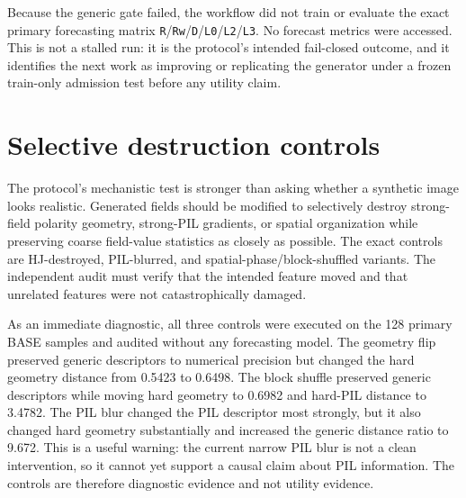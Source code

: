 \documentclass[11pt,oneside]{report}
\begin{document}
\begin{table}[htbp]
\centering\small
\caption{Completed remote train-only gate. Targeted distances improved, but the broad generic gate failed for every fresh arm.}
\label{tab:remote-physics-gate}
\end{table}

Because the generic gate failed, the workflow did not train or evaluate the exact primary forecasting matrix \texttt{R}/\texttt{Rw}/\texttt{D}/\texttt{L0}/\texttt{L2}/\texttt{L3}. No forecast metrics were accessed. This is not a stalled run: it is the protocol’s intended fail-closed outcome, and it identifies the next work as improving or replicating the generator under a frozen train-only admission test before any utility claim.

\section{Selective destruction controls}

The protocol’s mechanistic test is stronger than asking whether a synthetic image looks realistic. Generated fields should be modified to selectively destroy strong-field polarity geometry, strong-PIL gradients, or spatial organization while preserving coarse field-value statistics as closely as possible. The exact controls are HJ-destroyed, PIL-blurred, and spatial-phase/block-shuffled variants. The independent audit must verify that the intended feature moved and that unrelated features were not catastrophically damaged.

As an immediate diagnostic, all three controls were executed on the 128 primary BASE samples and audited without any forecasting model. The geometry flip preserved generic descriptors to numerical precision but changed the hard geometry distance from 0.5423 to 0.6498. The block shuffle preserved generic descriptors while moving hard geometry to 0.6982 and hard-PIL distance to 3.4782. The PIL blur changed the PIL descriptor most strongly, but it also changed hard geometry substantially and increased the generic distance ratio to 9.672. This is a useful warning: the current narrow PIL blur is not a clean intervention, so it cannot yet support a causal claim about PIL information. The controls are therefore diagnostic evidence and not utility evidence.
\end{document}

